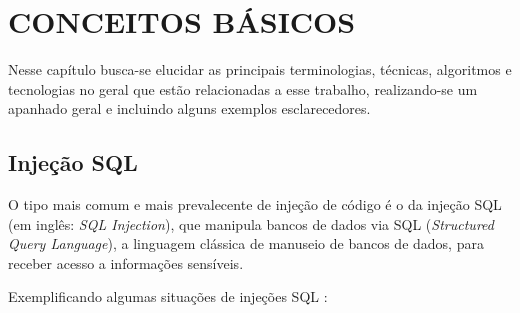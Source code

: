 \chapter{CONCEITOS BÁSICOS\textbf{}}
\label{chp:capitulo2}

Nesse capítulo busca-se elucidar as principais terminologias, técnicas, algoritmos e tecnologias no geral que estão relacionadas a esse trabalho, realizando-se um apanhado geral e incluindo alguns exemplos esclarecedores.

\section{Injeção SQL}

O tipo mais comum e mais prevalecente de injeção de código é o da injeção SQL (em inglês: \textit{SQL Injection}), que manipula bancos de dados via SQL (\textit{Structured Query Language}), a linguagem clássica de manuseio de bancos de dados, para receber acesso a informações sensíveis.

Exemplificando algumas situações de injeções SQL \cite{sql_port_swigger}:

